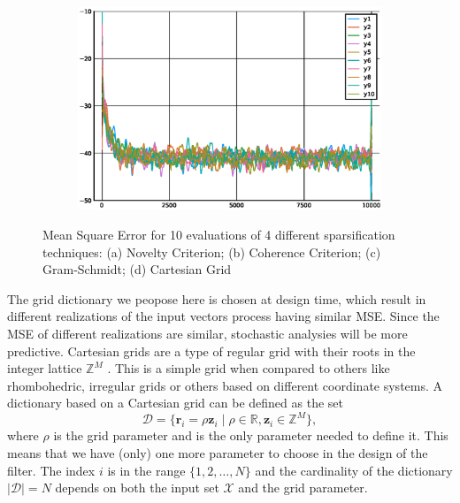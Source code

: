 \begin{figure}
\begin{subfigure}[b]{0.45\linewidth}
        \caption{}
        \label{fig:err2_gs}
    \end{subfigure}
    \begin{subfigure}[b]{0.45\linewidth}
        \includegraphics[width=\linewidth]{figuras/err2_cg_sparse.eps}
        \caption{}
        \label{fig:err2_cg}
    \end{subfigure}
    \caption{Mean Square Error for 10 evaluations of 4 different sparsification techniques: (a) Novelty Criterion; (b) Coherence Criterion; (c) Gram-Schmidt; (d) Cartesian Grid}
    \label{fig:err2_sparsifications}
\end{figure}

The grid dictionary we peopose here is chosen at design time, which result in different realizations of the input vectors process having similar MSE. Since the MSE of different realizations are similar, stochastic analysies will be more predictive. Cartesian grids \cite{thompson_handbook_1999} are a type of regular grid with their roots in the integer lattice $\mathbb{Z}^M$ \cite{conway_sphere_1993}. This is a simple grid when compared to others like rhombohedric, irregular grids or others based on different coordinate systems. A dictionary based on a Cartesian grid can be defined as the set
\begin{equation}
    \mathcal{D} = \{ \mathbf{r}_i = \rho\mathbf{z}_i\;|\;\rho \in \mathbb{R}, \mathbf{z}_i \in \mathbb{Z}^M \},\label{eq:grid}
\end{equation}
where $\rho$ is the grid parameter and is the only parameter needed to define it. This means that we have (only) one more parameter to choose in the design of the filter. The index $i$ is in the range $\{1, 2, \dots, N\} $ and the cardinality of the dictionary $|\mathcal{D}| = N$ depends on both the input set $\mathcal{X}$ and the grid parameter.

